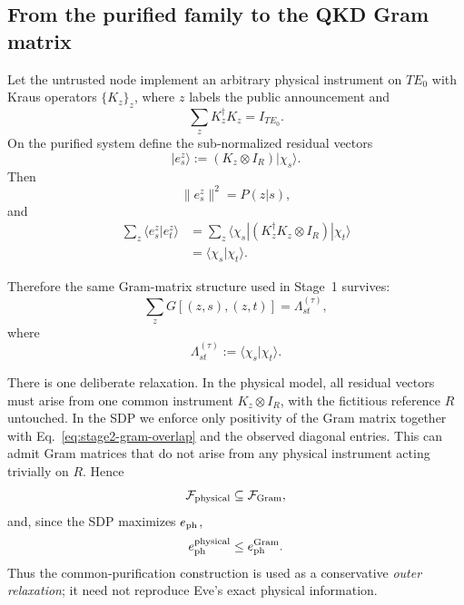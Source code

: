 \documentclass[11pt]{article}
\theoremstyle{remark}
\begin{document}
\subsection{From the purified family to the QKD Gram matrix}

Let the untrusted node implement an arbitrary physical instrument on \(TE_0\)
with Kraus operators \(\{K_z\}_z\), where \(z\) labels the public
announcement and
\[
    \sum_zK_z^\dagger K_z=I_{TE_0}.
\]
On the purified system define the sub-normalized residual vectors
\begin{equation}
    |e_s^z\rangle
    :=
    (K_z\otimes I_R)|\chi_s\rangle.
    \label{eq:stage2-residual-vectors}
\end{equation}
Then
\[
    \|e_s^z\|^2=P(z|s),
\]
and
\begin{align}
    \sum_z\langle e_s^z|e_t^z\rangle
    &=
    \sum_z
    \langle\chi_s|
    (K_z^\dagger K_z\otimes I_R)
    |\chi_t\rangle
    \nonumber\\
    &=
    \langle\chi_s|\chi_t\rangle.
    \label{eq:stage2-gram-conservation}
\end{align}

Therefore the same Gram-matrix structure used in Stage~1 survives:
\begin{equation}
    \sum_z G[(z,s),(z,t)]
    =
    \Lambda^{(\tau)}_{st},
    \label{eq:stage2-gram-overlap}
\end{equation}
where
\[
    \Lambda^{(\tau)}_{st}
    :=
    \langle\chi_s|\chi_t\rangle.
\]

There is one deliberate relaxation.  In the physical model, all residual
vectors must arise from one common instrument \(K_z\otimes I_R\), with the
fictitious reference \(R\) untouched.  In the SDP we enforce only positivity
of the Gram matrix together with
Eq.~\eqref{eq:stage2-gram-overlap} and the observed diagonal entries.  This
can admit Gram matrices that do not arise from any physical instrument acting
trivially on \(R\).  Hence
\[
    \mathcal F_{\rm physical}
    \subseteq
    \mathcal F_{\rm Gram},
\]
and, since the SDP maximizes \(e_{\rm ph}\),
\begin{equation}
    e_{\rm ph}^{\rm physical}
    \le
    e_{\rm ph}^{\rm Gram}.
    \label{eq:stage2-outer-direction}
\end{equation}
Thus the common-purification construction is used as a conservative
\emph{outer relaxation}; it need not reproduce Eve's exact physical
information.
\end{document}

